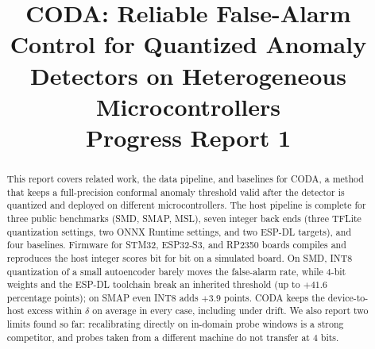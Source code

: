 \documentclass[conference]{IEEEtran}
\begin{document}
\raggedbottom

\title{CODA: Reliable False-Alarm Control for Quantized Anomaly Detectors on Heterogeneous Microcontrollers\\[0.3em]\large Progress Report 1}

\author{
}

\maketitle

\begin{abstract}
This report covers related work, the data pipeline, and baselines for CODA, a method that keeps a full-precision conformal anomaly threshold valid after the detector is quantized and deployed on different microcontrollers. The host pipeline is complete for three public benchmarks (SMD, SMAP, MSL), seven integer back ends (three TFLite quantization settings, two ONNX Runtime settings, and two ESP-DL targets), and four baselines. Firmware for STM32, ESP32-S3, and RP2350 boards compiles and reproduces the host integer scores bit for bit on a simulated board. On SMD, INT8 quantization of a small autoencoder barely moves the false-alarm rate, while 4-bit weights and the ESP-DL toolchain break an inherited threshold (up to $+41.6$ percentage points); on SMAP even INT8 adds $+3.9$ points. CODA keeps the device-to-host excess within $\delta$ on average in every case, including under drift. We also report two limits found so far: recalibrating directly on in-domain probe windows is a strong competitor, and probes taken from a different machine do not transfer at 4 bits.
\end{abstract}
\end{document}
